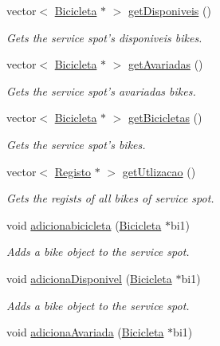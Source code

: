 \begin{DoxyCompactItemize}
vector$<$ \hyperlink{class_bicicleta}{Bicicleta} $\ast$ $>$ \hyperlink{class_posto_servico_a0d3be8347bcfe2ff61915f0fe4688f11}{get\+Disponiveis} ()
\begin{DoxyCompactList}\small\item\em Gets the service spot's disponiveis bikes. \end{DoxyCompactList}\item 
vector$<$ \hyperlink{class_bicicleta}{Bicicleta} $\ast$ $>$ \hyperlink{class_posto_servico_ae2675fbf3044cd0cc366fbec67449969}{get\+Avariadas} ()
\begin{DoxyCompactList}\small\item\em Gets the service spot's avariadas bikes. \end{DoxyCompactList}\item 
vector$<$ \hyperlink{class_bicicleta}{Bicicleta} $\ast$ $>$ \hyperlink{class_posto_servico_a747fd34e7c83f28f1697284b6e139e2e}{get\+Bicicletas} ()
\begin{DoxyCompactList}\small\item\em Gets the service spot's bikes. \end{DoxyCompactList}\item 
vector$<$ \hyperlink{class_registo}{Registo} $\ast$ $>$ \hyperlink{class_posto_servico_abfe611099f0fb1d79f7a2344496af023}{get\+Utlizacao} ()
\begin{DoxyCompactList}\small\item\em Gets the regists of all bikes of service spot. \end{DoxyCompactList}\item 
void \hyperlink{class_posto_servico_afceba43d75e3b42c54cc6e8ff59ff22f}{adicionabicicleta} (\hyperlink{class_bicicleta}{Bicicleta} $\ast$bi1)
\begin{DoxyCompactList}\small\item\em Adds a bike object to the service spot. \end{DoxyCompactList}\item 
void \hyperlink{class_posto_servico_a1b250081e0af407dc3ea0e7755da99a2}{adiciona\+Disponivel} (\hyperlink{class_bicicleta}{Bicicleta} $\ast$bi1)
\begin{DoxyCompactList}\small\item\em Adds a bike object to the service spot. \end{DoxyCompactList}\item 
void \hyperlink{class_posto_servico_a2e01d6a12f30c50ca8c6d2eb50b33e0e}{adiciona\+Avariada} (\hyperlink{class_bicicleta}{Bicicleta} $\ast$bi1)

\end{DoxyCompactItemize}
